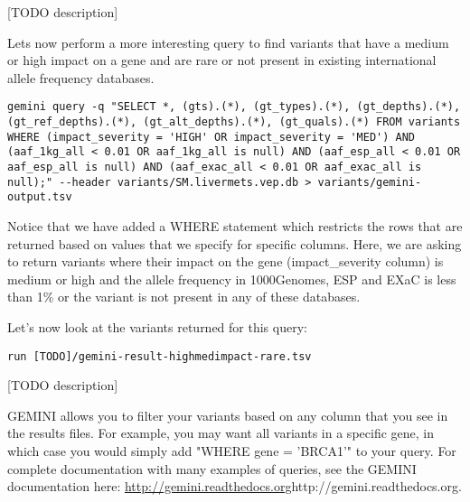 [TODO description]

Lets now perform a more interesting query to find variants that have a medium or high impact on a gene and are rare or not present in existing international allele frequency databases.

\begin{steps}
\begin{lstlisting}
gemini query -q "SELECT *, (gts).(*), (gt_types).(*), (gt_depths).(*), (gt_ref_depths).(*), (gt_alt_depths).(*), (gt_quals).(*) FROM variants WHERE (impact_severity = 'HIGH' OR impact_severity = 'MED') AND (aaf_1kg_all < 0.01 OR aaf_1kg_all is null) AND (aaf_esp_all < 0.01 OR aaf_esp_all is null) AND (aaf_exac_all < 0.01 OR aaf_exac_all is null);" --header variants/SM.livermets.vep.db > variants/gemini-output.tsv
\end{lstlisting}
\end{steps}

Notice that we have added a WHERE statement which restricts the rows that are returned based on values that we specify for specific columns. Here, we are asking to return variants where their impact on the gene (impact\_severity column) is medium or high and the allele frequency in 1000Genomes, ESP and EXaC is less than 1\% or the variant is not present in any of these databases.

\begin{steps}
Let's now look at the variants returned for this query:
\begin{lstlisting}
run [TODO]/gemini-result-highmedimpact-rare.tsv
\end{lstlisting}
\end{steps}

[TODO description]

GEMINI allows you to filter your variants based on any column that you see in the results files. For example, you may want all variants in a specific gene, in which case you would simply add "WHERE gene = 'BRCA1'" to your query. For complete documentation with many examples of queries, see the GEMINI documentation here: \url{http://gemini.readthedocs.org}{http://gemini.readthedocs.org}.


\newpage


